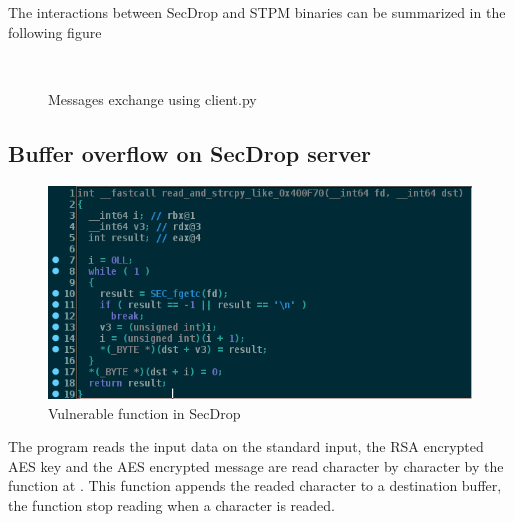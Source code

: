 \documentclass[a4paper]{article}
\begin{document}
The interactions between SecDrop and STPM binaries can be summarized in the following figure

\begin{figure}[H]
    \center
    \begin{msc}{}{}
    \setlength{\instdist}{.3\textwidth}%
    \tt
    \nextlevel
    \nextlevel
    \nextlevel
    \nextlevel
    \nextlevel
    \end{msc}
    \caption{Messages exchange using client.py}
\end{figure}

\subsection{Buffer overflow on SecDrop server}

\begin{figure}[H]
    \center
    \includegraphics[scale=0.6]{buffer_overflow_secdrop}
    \caption{Vulnerable function in SecDrop}
\end{figure}

The  program reads the input data on the standard input, the RSA encrypted AES key and the AES encrypted message are read character by character by the function at .
This function appends the readed character to a destination buffer, the function stop reading when a  character is readed.
\end{document}
